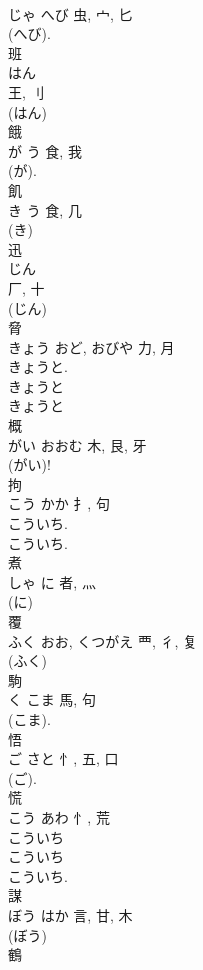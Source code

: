 \documentclass[8pt]{extreport}
\begin{document}
\begin{CJK}{UTF8}{min}
\\	じゃ	へび	虫, 宀, 匕	
\\	(へび).	
\\	班	
\\	はん	
\\	王, 刂	
\\	(はん) 
\\	餓	
\\	が	う	食, 我	
\\	(が). 
\\	飢	
\\	き	う	食, 几	
\\	(き) 
\\	迅	
\\	じん	
\\	厂, 十		
\\	(じん) 
\\	脅	
\\	きょう	おど, おびや	力, 月	
\\	きょうと. 
\\	きょうと 
\\	きょうと 
\\	概	
\\	がい	おおむ	木, 艮, 牙	
\\	(がい)! 
\\	拘	
\\	こう	かか	扌, 句	
\\	こういち. 
\\	こういち.	
\\	煮	
\\	しゃ	に	者, 灬	
\\	(に) 
\\	覆	
\\	ふく	おお, くつがえ	覀, 彳, 复	
\\	(ふく) 
\\	駒	
\\	く	こま	馬, 句	
\\	(こま). 
\\	悟	
\\	ご	さと	忄, 五, 口	
\\	(ご). 
\\	慌	
\\	こう	あわ	忄, 荒	
\\	こういち 
\\	こういち 
\\	こういち. 
\\	謀	
\\	ぼう	はか	言, 甘, 木	
\\	(ぼう) 
\\	鶴	

\end{CJK}
\end{document}
